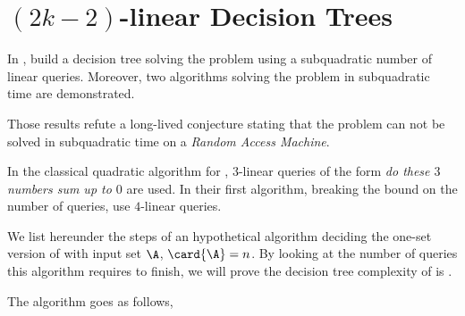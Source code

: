 \section{$(2k-2)$-linear Decision Trees}

In \cite{gronlund:2014}, \citeauthor{gronlund:2014} build a decision tree
solving the \threeSUM problem using
a subquadratic number of linear queries. Moreover, two algorithms
solving the \threeSUM problem in subquadratic time are demonstrated.

Those results refute a long-lived conjecture stating that the \threeSUM problem
can not be solved in subquadratic time on a \emph{Random Access Machine}.

In the classical quadratic algorithm for \threeSUM, $3$-linear queries of the
form \emph{do these $3$ numbers sum up to $0$} are used. In their first
algorithm, breaking the  bound on the number of queries,
\citeauthor{gronlund:2014} use $4$-linear queries.

We list hereunder the steps of an hypothetical algorithm deciding the one-set
version of \threeSUM with input set $\A$, $\card{\A} = n$. By looking at the
number of queries this algorithm requires to finish, we will prove the
decision tree complexity of \threeSUM is .

The algorithm goes as follows,

